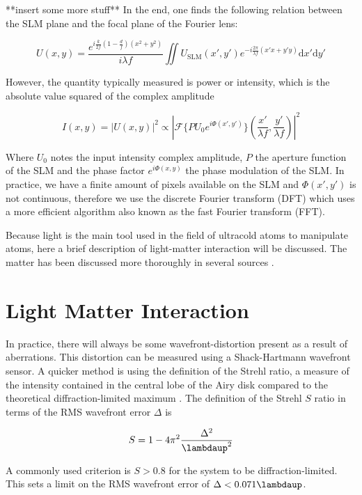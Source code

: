 **insert some more stuff** In the end, one finds the following relation between the SLM plane and the focal plane of the Fourier lens:

\begin{equation}\label{relationSLMlens}
	U(x, y)=\frac{e^{i \frac{k}{2 f}\left(1-\frac{d}{f}\right)\left(x^{2}+y^{2}\right)}}{i \lambda f} \iint U_{\text{SLM}}(x', y') e^{-i \frac{2 \pi}{\lambda f}(x'x+y'y)} \mathrm{d}x'\mathrm{d}y'
\end{equation}

However, the quantity typically measured is power or intensity, which is the absolute value squared of the complex amplitude \cite{Dijk2012,Bijnen2015}

\begin{equation}\label{FourierFinal}
	I(x,y) = |U(x,y)|^2 \propto \left| \mathscr{F} \{ PU_0 e^{i \Phi(x',y')} \} (\frac{x'}{\lambda f},\frac{y'}{\lambda f})\right|^2
\end{equation}

Where $U_0$ notes the input intensity complex amplitude, $P$ the aperture function of the SLM and the phase factor $e^{i \Phi(x,y)}$ the phase modulation of the SLM. In practice, we have a finite amount of pixels available on the SLM and $\Phi(x',y')$ is not continuous, therefore we use the discrete Fourier transform (DFT) which uses a more efficient algorithm also known as the fast Fourier transform (FFT). 






Because light is the main tool used in the field of ultracold atoms to manipulate atoms, here a brief description of light-matter interaction will be discussed. The matter has been discussed more thoroughly in several sources \cite{Metcalf1999,Vredenbregt2020,Leeuwen2017}.
\section{Light Matter Interaction}




In practice, there will always be some wavefront-distortion present as a result of aberrations. This distortion can be measured using a Shack-Hartmann wavefront sensor. A quicker method is using the definition of the Strehl ratio, a measure of the intensity contained in the central lobe of the Airy disk compared to the theoretical diffraction-limited maximum \cite{Sortais2007}. The definition of the Strehl $S$ ratio in terms of the RMS wavefront error $\Delta$ is 

\begin{equation}\label{Strehl}
	S = 1- 4\pi^2\frac{\Delta^2}{\lambdaup^2}
\end{equation}

A commonly used criterion is $S>0.8$ for the system to be diffraction-limited. This sets a limit on the RMS wavefront error of $\Delta < 0.071 \lambdaup$.
